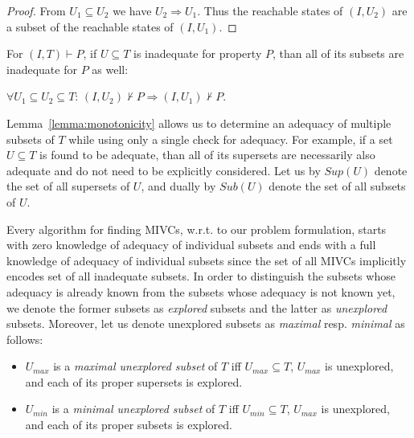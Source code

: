 \begin{proof}
From $U_1 \subseteq U_2$ we have $U_2 \Rightarrow U_1$. Thus the
reachable states of $(I, U_2)$ are a subset of the reachable states
of $(I, U_1)$.
\end{proof}

\begin{corollary}
For $(I, T) \vdash P$, if $U \subseteq T$ is inadequate for property $P$, than all of its subsets are inadequate for $P$ as well:
\begin{center}
$\forall U_1 \subseteq U_2 \subseteq T: \, (I, U_2) \nvdash P \Rightarrow (I, U_1) \nvdash P$.
\end{center}
\end{corollary}

Lemma~\ref{lemma:monotonicity} allows us to determine an adequacy of multiple subsets of $T$ while using only a single check for adequacy. For example, if a set $U \subseteq T$ is found to be adequate, than all of its supersets are necessarily also adequate and do not need to be explicitly considered. Let us by $\mathit{Sup}(U)$ denote the set of all supersets of $U$, and dually by $\mathit{Sub}(U)$ denote the set of all subsets of $U$.

Every algorithm for finding MIVCs, w.r.t. to our problem formulation, starts with zero knowledge of adequacy of individual subsets and ends with a full knowledge of adequacy of individual subsets since the set of all MIVCs implicitly encodes set of all inadequate subsets. 
In order to distinguish the subsets whose adequacy is already known from the subsets whose adequacy is not known yet, we denote the former subsets as \emph{explored} subsets and the latter as \emph{unexplored} subsets. Moreover, let us denote unexplored subsets as \emph{maximal} resp. \emph{minimal} as follows:

\begin{itemize}
	\item $U_{max}$ is a \emph{maximal unexplored subset} of $T$ iff $U_{max} \subseteq T$, $U_{max}$ is unexplored, and each of its proper supersets is explored.
	\item $U_{min}$ is a \emph{minimal unexplored subset} of $T$ iff $U_{min} \subseteq T$, $U_{max}$ is unexplored, and each of its proper subsets is explored.
\end{itemize}



